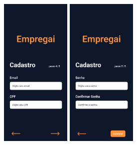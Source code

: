 \begin{figure}[hbb]
\begin{center}
		\includegraphics[width=0.3\textwidth]{images/Cadastro-4.png}
		\includegraphics[width=0.3\textwidth]{images/Cadastro-5.png}
	\end{center}
\end{figure}

